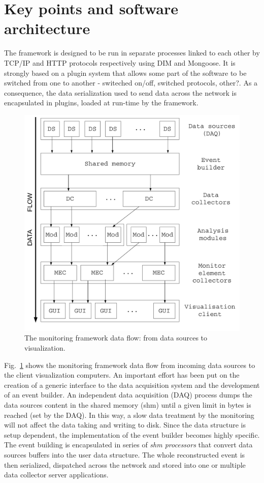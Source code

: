 \documentclass[conference]{IEEEtran}
\begin{document}
\section{Key points and software architecture}

The framework is designed to be run in separate processes linked to each other by TCP/IP and HTTP protocols respectively using DIM\cite{DIM} and Mongoose\cite{MONGOOSE}. It is strongly based on a plugin system that allows some part of the software to be switched {\color{red}from one to another - switeched on/off, switched protocols, other?}. As a consequence, the data serialization used to send data across the network is encapsulated in plugins, loaded at run-time by the framework.

\begin{figure}[htbp]
  \includegraphics[width=\linewidth]{DQMWorkflow.pdf}
  \caption{\label{DQM_WORKFLOW}The monitoring framework data flow: from data sources to visualization.}
\end{figure}

Fig.~\ref{DQM_WORKFLOW} shows the monitoring framework data flow from incoming data sources to the client visualization computers. An important effort has been put on the creation of a generic interface to the data acquisition system and the development of an event builder. An independent data acquisition (DAQ) process dumps the data sources content in the shared memory (shm) until a given limit in bytes is reached (set by the DAQ). In this way, a slow data treatment by the monitoring will not affect the data taking and writing to disk. Since the data structure is setup dependent, the implementation of the event builder becomes highly specific. The event building is encapsulated in series of \textit{shm processors} that convert data sources buffers into the user data structure. The whole reconstructed event is then serialized, dispatched across the network and stored into one or multiple data collector server applications.
\end{document}
